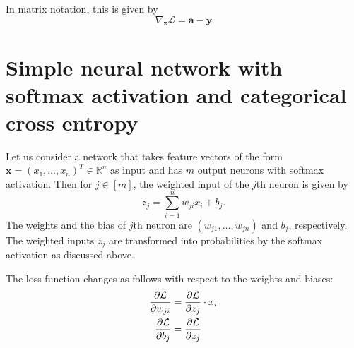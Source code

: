 \documentclass[12pt]{article}
\newcommand{\R}{\mathbb{R}}
\newcommand{\x}{\boldsymbol{x}}
\begin{document}
In matrix notation, this is given by
\begin{equation}
\nabla_{\boldsymbol{z}} \mathcal{L} = \boldsymbol{a} - \boldsymbol{y}
\end{equation}

\section{Simple neural network with softmax activation and categorical cross entropy}

Let us consider a network that takes feature vectors of the form $\x=(x_1,\ldots,x_n)^T\in \R^n$ as input and has $m$ output neurons with softmax activation.  Then for $j\in[m]$, the weighted input of the $j$th neuron is given by
\begin{equation}
z_j = \sum_{i=1}^n w_{ji} x_i + b_j.
\end{equation}
The weights and the bias of $j$th neuron are $(w_{j1},\ldots,w_{jn})$ and $b_j$, respectively.  The weighted inputs $z_j$ are transformed into probabilities by the softmax activation as discussed above.

The loss function changes as follows with respect to the weights and biases:
\begin{align}
{\partial \mathcal{L} \over \partial w_{ji}} 
&=
{\partial \mathcal{L} \over \partial z_j} \cdot x_i \\
{\partial \mathcal{L} \over \partial b_j} 
&=
{\partial \mathcal{L} \over \partial z_j}
\end{align}
\end{document}
